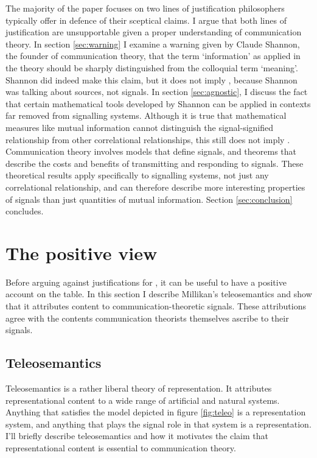 \documentclass[12pt]{article}
\begin{document}
The majority of the paper focuses on two lines of justification philosophers typically offer in defence of their sceptical claims.
I argue that both lines of justification are unsupportable given a proper understanding of communication theory.
In section \ref{sec:warning} I examine a warning given by Claude Shannon, the founder of communication theory, that the term `information' as applied in the theory should be sharply distinguished from the colloquial term `meaning'.
Shannon did indeed make this claim, but it does not imply \tic{}, because Shannon was talking about sources, not signals.
In section \ref{sec:agnostic}, I discuss the fact that certain mathematical tools developed by Shannon can be applied in contexts far removed from signalling systems.
Although it is true that mathematical measures like mutual information cannot distinguish the signal-signified relationship from other correlational relationships, this still does not imply \tic{}. 
Communication theory involves models that define signals, and theorems that describe the costs and benefits of transmitting and responding to signals.
These theoretical results apply specifically to signalling systems, not just any correlational relationship, and can therefore describe more interesting properties of signals than just quantities of mutual information.
Section \ref{sec:conclusion} concludes.

\section{The positive view}\label{sec:positive}

Before arguing against justifications for \tic{}, it can be useful to have a positive account on the table.
In this section I describe Millikan's teleosemantics and show that it attributes content to communication-theoretic signals.
These attributions agree with the contents communication theorists themselves ascribe to their signals.

\subsection{Teleosemantics}
Teleosemantics is a rather liberal theory of representation.
It attributes representational content to a wide range of artificial and natural systems.
Anything that satisfies the model depicted in figure \ref{fig:teleo} is a representation system, and anything that plays the signal role in that system is a representation.
I'll briefly describe teleosemantics and how it motivates the claim that representational content is essential to communication theory.
\end{document}
